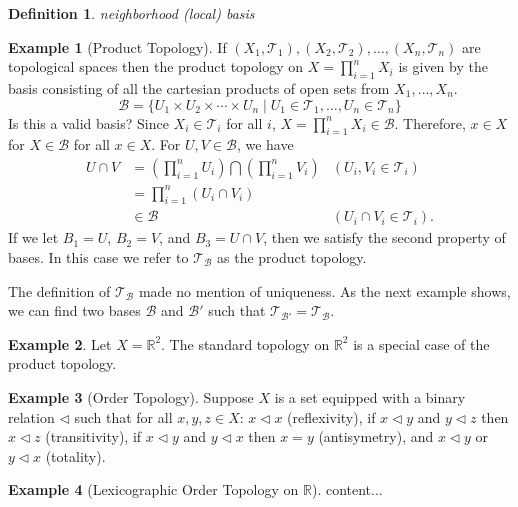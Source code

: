 \documentclass{article}
\newcommand{\R}{\mathbb{R}}
\newcommand{\T}{\mathcal{T}}
\theoremstyle{definition}
\newtheorem{definition}{Definition}[section]
\newtheorem{example}{Example}[section]
\begin{document}
	\begin{definition}
		\textit{\color{red}neighborhood (local) basis}
	\end{definition}
	
	\begin{example}[Product Topology]
		If $(X_1,\T_1), (X_2,\T_2),\ldots,(X_n,\T_n)$ are topological spaces then the product topology on $X = \prod_{i=1}^{n}X_i$ is given by the basis consisting of all the cartesian products of open sets from $X_1,\ldots, X_n$. 
		$$ \mathscr{B} = \{U_1\times U_2\times \cdots \times U_n \mid U_1 \in \T_1,\ldots, U_n\in \T_n\} $$ Is this a valid basis? Since $X_i\in \T_i$ for all $i$, $X = \prod_{i=1}^{n}X_i \in \mathscr{B}$. Therefore, $x\in X$ for $X \in \mathscr B$ for all $x\in X$. For $U,V\in \mathscr{B}$, we have 
		\begin{align*}
			U \cap V &= \left(\prod_{i=1}^{n}U_i\right) \bigcap \left(\prod_{i=1}^{n}V_i\right) &(U_i,V_i \in \T_i)
			\\&  = \prod_{i=1}^{n}(U_i \cap V_i)\\
			& \in \mathscr{B} & (U_i\cap V_i \in \T_i).
		\end{align*}
	If we let $B_1=U$, $B_2 = V$, and $B_3 = U\cap V$, then we satisfy the second property of bases. In this case we refer to $\T_{\mathscr B}$ as the product topology. 
	
	
	
	\end{example}

	The definition of $\T_{\mathscr B}$ made no mention of uniqueness. As the next example shows, we can find two bases $\mathscr{B}$ and $\mathscr{B}'$ such that $\T_{\mathscr B'} = \T_{\mathscr B}$.
	
	\begin{example}
		Let $X=\R^2$. The standard topology on $\R^2$ is a special case of the product topology. 
	\end{example}
	
	\begin{example}[Order Topology]
		Suppose $X$ is a set equipped with a binary relation $\lhd$ such that for all $x,y,z\in X$: $x\lhd x$ (reflexivity), if $x\lhd y$ and $y\lhd z$ then $x\lhd z$ (transitivity), if $x\lhd y$ and $y\lhd x$ then $x=y$ (antisymetry), and $x\lhd y$ or $y\lhd x$ (totality). 
	\end{example}

	\begin{example}[Lexicographic Order Topology on $\R$]
		content...
	\end{example}
\end{document}
